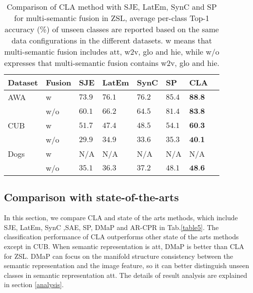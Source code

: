 \documentclass[review]{elsarticle}
\begin{document}
\begin{table}[!ht]
\small
\renewcommand{\arraystretch}{1.0}
\caption{Comparison of CLA method with SJE\cite{7298911}, LatEm\cite{7780384}, SynC \cite{Changpinyo2016} and SP\cite{Lin2018structure} for multi-semantic fusion in ZSL, average per-class Top-1 accuracy (\%) of unseen classes are reported based on the same data configurations in the different datasets. w means that multi-semantic fusion includes att, w2v, glo and hie, while w/o expresses that multi-semantic fusion contains w2v, glo and hie.}
\label{table4}
\begin{center}
\newcommand{\tabincell}[2]{\begin{tabular}{@{}#1@{}}#2\end{tabular}}
\begin{tabular}{lp{1cm}p{1cm}p{1cm}p{1cm}p{1cm}p{1cm}p{1cm}}
\hline
\bfseries Dataset &\bfseries Fusion &\bfseries SJE &\bfseries LatEm &\bfseries SynC &\bfseries SP &\bfseries CLA\\
\hline \hline
AWA  & w   &$73.9$ & $76.1$ &$76.2$ & $85.4$ &$\textbf{88.8}$\\
     & w/o &$60.1$ & $66.2$ &$64.5$ & $81.4$ &$\textbf{83.8}$\\
\hline
CUB  & w   &$51.7$ & $47.4$ &$48.5$ & $54.1$ &$\textbf{60.3}$\\
     & w/o &$29.9$ & $34.9$ &$33.6$ & $35.3$ &$\textbf{40.1}$\\
\hline
Dogs & w   &N/A & N/A &N/A & N/A &N/A\\
     & w/o &$35.1$ & $36.3$ &$37.2$ & $48.1$ &$\textbf{48.6}$\\
\hline
\end{tabular}
\end{center}
\end{table}

\subsection{Comparison with state-of-the-arts}
In this section, we compare CLA and state of the arts methods, which include SJE\cite{7298911}, LatEm\cite{7780384}, SynC \cite{Changpinyo2016},SAE\cite{Kodirov2017}, SP\cite{Lin2018structure}, DMaP \cite{Li2017Paths} and AR-CPR\cite{8016672} in Tab.\ref{table5}. The classification performance of CLA outperforms other state of the arts methods except in CUB. When semantic representation is att, DMaP \cite{Li2017Paths} is better than CLA for ZSL. DMaP can focus on the manifold structure consistency between the semantic representation and the image feature, so it can better distinguish unseen classes in semantic representation att. The details of result analysis are explained in section \ref{analysis}.
\end{document}
